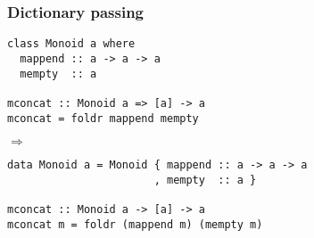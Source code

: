 \documentclass[serif,professionalfont]{beamer}
\begin{document}
\begin{frame}[fragile]
\frametitle{Dictionary passing}
\label{sec-12}


\begin{verbatim}
class Monoid a where
  mappend :: a -> a -> a
  mempty  :: a

mconcat :: Monoid a => [a] -> a
mconcat = foldr mappend mempty
\end{verbatim}

\pause

$\Rightarrow$

\begin{verbatim}
data Monoid a = Monoid { mappend :: a -> a -> a
                       , mempty  :: a }

mconcat :: Monoid a -> [a] -> a
mconcat m = foldr (mappend m) (mempty m)
\end{verbatim}
\end{frame}
\end{document}
